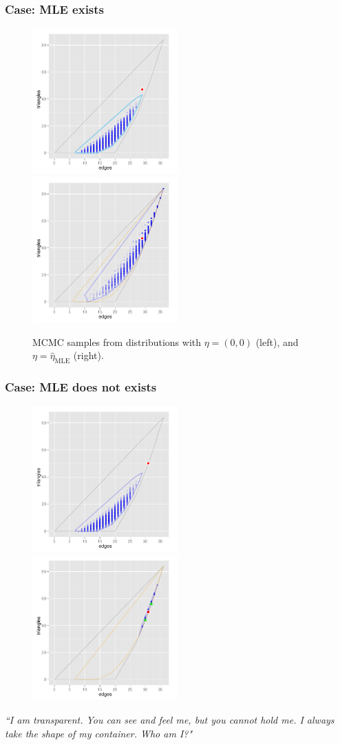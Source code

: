 \documentclass[ 10pt]{beamer}
\newcommand{\etaMLE}{\hat{\eta}_{\textrm{MLE}}}
\begin{document}
\frame
{
\frametitle{Case: MLE exists}  
\begin{figure}[h]
\centering
\includegraphics[height=2.2in]{MCsample-far}
\includegraphics[height=2.2in]{MCsample-MLE}
\caption{MCMC samples from distributions with $\eta = (0,0)$ (left), and $\eta=\etaMLE$ (right).}
\label{F:MCsample-MLE exists}
\end{figure}
}


\frame
{
\frametitle{Case: MLE does not exists}  
\begin{figure}[h]
\centering
\includegraphics[height=2.2in]{MCsample-boundary}
\includegraphics[height=2.2in]{MCsample-77face}
\label{F:MCsample-MLE nonexistent}
\end{figure}
\pause
\emph{``I am transparent. You can see and feel me, but you cannot hold me. I always take the shape of my container. Who am I?"}
}
\end{document}
